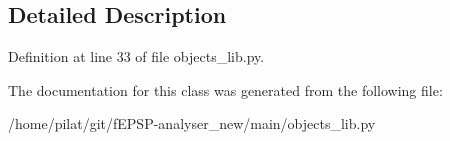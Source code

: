 \subsection{Detailed Description}


Definition at line 33 of file objects\-\_\-lib.\-py.



The documentation for this class was generated from the following file\-:\begin{DoxyCompactItemize}
\item 
/home/pilat/git/f\-E\-P\-S\-P-\/analyser\-\_\-new/main/objects\-\_\-lib.\-py\end{DoxyCompactItemize}
